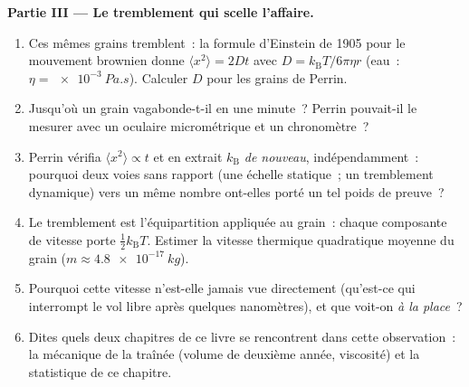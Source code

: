 \begin{problem}
\medskip\noindent\textbf{Partie III --- Le tremblement qui scelle l'affaire.}
\begin{enumerate}[resume]
  \item Ces mêmes grains tremblent~: la formule d'Einstein de 1905
        pour le mouvement brownien donne $\langle x^2\rangle = 2Dt$ avec $D =
        k_{\text{B}}T/6\pi\eta r$ (eau~: $\eta =
        \qty{e-3}{Pa.s}$). Calculer $D$ pour les grains de Perrin.
  \item Jusqu'où un grain vagabonde-t-il en une minute~? Perrin
        pouvait-il le mesurer avec un oculaire micrométrique et un
        chronomètre~?
  \item Perrin vérifia $\langle x^2\rangle \propto t$ et en extrait
        $k_{\text{B}}$ \emph{de nouveau}, indépendamment~: pourquoi
        deux voies sans rapport (une échelle statique~; un
        tremblement dynamique) vers un même nombre ont-elles porté un
        tel poids de preuve~?
  \item Le tremblement est l'équipartition appliquée au grain~:
        chaque composante de vitesse porte $\tfrac12 k_{\text{B}}T$.
        Estimer la vitesse thermique quadratique moyenne du grain ($m \approx
        \qty{4.8e-17}{kg}$).
  \item Pourquoi cette vitesse n'est-elle jamais vue directement
        (qu'est-ce qui interrompt le vol libre après quelques
        nanomètres), et que voit-on \emph{à la place}~?
  \item Dites quels deux chapitres de ce livre se rencontrent dans
        cette observation~: la mécanique de la traînée (volume de
        deuxième année, viscosité) et la statistique de ce chapitre.
\end{enumerate}


\end{problem}
